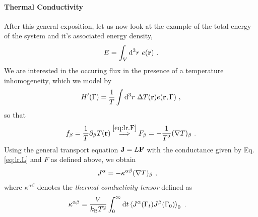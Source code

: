 \paragraph{Thermal Conductivity}
After this general exposition, let us now look at the example of the total energy of the system and it's associated energy density,
\begin{align}
	E = \int_V {\rm d}^3 r ~ e({\bf r})~.
	\label{eq:lr.E}
\end{align}
We are interested in the occuring flux in the presence of a temperature inhomogeneity, which we model by
\begin{align}
	H' (\Gamma) = \frac{1}{T} \int {\rm d}^3 r ~ \Delta T ({\bf r}) e({\bf r}, \Gamma)~,
	\label{eq:lr.Hp.temp}
\end{align}
so that
\begin{align}
	f_\beta = \frac{1}{T} \partial_\beta T ({\bf r}) 
		\stackrel{\eqref{eq:lr.F}}{\implies}
	F_\beta = - \frac{1}{T^2} ({\bf \nabla} T)_\beta ~.
	\label{eq:lr.F.temp}
\end{align}
Using the general transport equation ${\bf J} = L {\bf F}$ with the conductance given by Eq.\,\eqref{eq:lr.L} and $F$ as defined above, we obtain
\begin{align}
	J^\alpha 
		&= - \kappa^{\alpha \beta} ({\bf \nabla} T)_\beta~,
	\label{eq:lr.J.2}
\end{align}
where $\kappa^{\alpha \beta}$ denotes the \emph{thermal conductivity tensor} defined as
\begin{align}
	\kappa^{\alpha \beta}
		&=
		\frac{V}{k_{\rm B} T^2} \int_{0}^{\infty} 
		{\rm d} t \braket{J^\alpha (\Gamma_t) J^\beta (\Gamma_{0})}_0 ~.
	\label{eq:GreenKubo}
\end{align}

